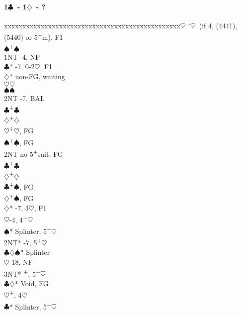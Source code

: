 \documentclass[10pt]{article}
\renewcommand{\c}{$\clubsuit$}
\renewcommand{\d}{$\diamondsuit$}
\newcommand{\h}{$\heartsuit$}
\newcommand{\s}{$\spadesuit$}
\newcommand{\p}{\textsuperscript{+}}
\newenvironment{bidtable}[1][]
{\textbf{#1}
  \begin{adjustwidth}{1em}{}
    \addvspace{2pt}
    \begin{tabbing}
      xxxxxxxx\=xxxxxxxx\=xxxxxxxx\=xxxxxxxx\=xxxxxxxx\=xxxxxxxx\=\kill}
{\end{tabbing}\end{adjustwidth}\bigskip}%
\begin{document}
\begin{multicols*}{2}
\begin{bidtable}[1\c\ - 1\d\ - ?]
1\h  {}\p\h\ (if 4, (4441), (5440) or 5\p m), F1 \\
     \s  {}\p\s                              \\
     \> 1NT  -4, NF                            \\
     \c* {}-7, 0-2\h, F1                     \\
     \>      \d*     \> non-FG, waiting        \\
     \>      \>          \h {}\h             \\
     \>      \>          \s {}\s             \\
     \>      \>          \> 2NT -7, BAL        \\
     \>      \>          \c {}\p\c           \\
     \>      \>          \d {}\p\d           \\
     \>      \h      {}\p\h, FG              \\
     \>      \s      {}\p\s, FG              \\
     \>      \> 2NT      \> no 5\p suit, FG        \\
     \>      \>          \c {}\p\c           \\
     \>      \>          \d {}\p\d           \\
     \>      \c      {}\p\s, FG              \\
     \>      \d      {}\p\s, FG              \\
     \d* {}-7, 3\h, F1                       \\
     \h  {}-4, 4\p\h                         \\
     \s* \> Splinter, 5\p\h                    \\
     \> 2NT* -7, 5\p\h                         \\
     \>      \c\d\s* \> Splinter               \\
     \>      \h      {}-18, NF              \\
     \>      \> 3NT*     \p, 5\p\h            \\
     \>      \c\d*   \> Void, FG               \\
     \>      \h      {}\p, 4\h              \\
     \c* \> Splinter, 5\p\h                    \\

\end{bidtable}
\end{multicols*}
\end{document}
